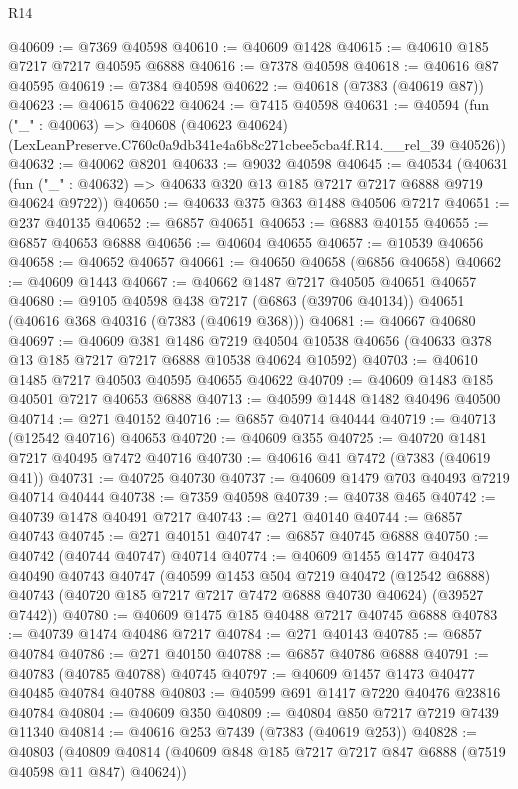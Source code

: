 \begin{lexlean}{R14}
\begin{coremodule}
@40609 := @7369 @40598
@40610 := @40609 @1428
@40615 := @40610 @185 @7217 @7217 @40595 @6888
@40616 := @7378 @40598
@40618 := @40616 @87 @40595
@40619 := @7384 @40598
@40622 := @40618 (@7383 (@40619 @87))
@40623 := @40615 @40622
@40624 := @7415 @40598
@40631 := @40594
    (fun ("_" : @40063) =>
    @40608 (@40623 @40624) (LexLeanPreserve.C760c0a9db341e4a6b8c271cbee5cba4f.R14.__rel_39 @40526))
@40632 := @40062 @8201
@40633 := @9032 @40598
@40645 := @40534
    (@40631 (fun ("_" : @40632) => @40633 @320 @13 @185 @7217 @7217 @6888 @9719 @40624 @9722))
@40650 := @40633 @375 @363 @1488 @40506 @7217
@40651 := @237 @40135
@40652 := @6857 @40651
@40653 := @6883 @40155
@40655 := @6857 @40653 @6888
@40656 := @40604 @40655
@40657 := @10539 @40656
@40658 := @40652 @40657
@40661 := @40650 @40658 (@6856 @40658)
@40662 := @40609 @1443
@40667 := @40662 @1487 @7217 @40505 @40651 @40657
@40680 := @9105
    @40598
    @438
    @7217
    (@6863 (@39706 @40134))
    @40651
    (@40616 @368 @40316 (@7383 (@40619 @368)))
@40681 := @40667 @40680
@40697 := @40609
    @381
    @1486
    @7219
    @40504
    @10538
    @40656
    (@40633 @378 @13 @185 @7217 @7217 @6888 @10538 @40624 @10592)
@40703 := @40610 @1485 @7217 @40503 @40595 @40655 @40622
@40709 := @40609 @1483 @185 @40501 @7217 @40653 @6888
@40713 := @40599 @1448 @1482 @40496 @40500
@40714 := @271 @40152
@40716 := @6857 @40714 @40444
@40719 := @40713 (@12542 @40716) @40653
@40720 := @40609 @355
@40725 := @40720 @1481 @7217 @40495 @7472 @40716
@40730 := @40616 @41 @7472 (@7383 (@40619 @41))
@40731 := @40725 @40730
@40737 := @40609 @1479 @703 @40493 @7219 @40714 @40444
@40738 := @7359 @40598
@40739 := @40738 @465
@40742 := @40739 @1478 @40491 @7217
@40743 := @271 @40140
@40744 := @6857 @40743
@40745 := @271 @40151
@40747 := @6857 @40745 @6888
@40750 := @40742 (@40744 @40747) @40714
@40774 := @40609
    @1455
    @1477
    @40473
    @40490
    @40743
    @40747
    (@40599
      @1453
      @504
      @7219
      @40472
      (@12542 @6888)
      @40743
      (@40720 @185 @7217 @7217 @7472 @6888 @40730 @40624)
      (@39527 @7442))
@40780 := @40609 @1475 @185 @40488 @7217 @40745 @6888
@40783 := @40739 @1474 @40486 @7217
@40784 := @271 @40143
@40785 := @6857 @40784
@40786 := @271 @40150
@40788 := @6857 @40786 @6888
@40791 := @40783 (@40785 @40788) @40745
@40797 := @40609 @1457 @1473 @40477 @40485 @40784 @40788
@40803 := @40599 @691 @1417 @7220 @40476 @23816 @40784
@40804 := @40609 @350
@40809 := @40804 @850 @7217 @7219 @7439 @11340
@40814 := @40616 @253 @7439 (@7383 (@40619 @253))
@40828 := @40803
    (@40809 @40814 (@40609 @848 @185 @7217 @7217 @847 @6888 (@7519 @40598 @11 @847) @40624))

\end{coremodule}
\end{lexlean}
